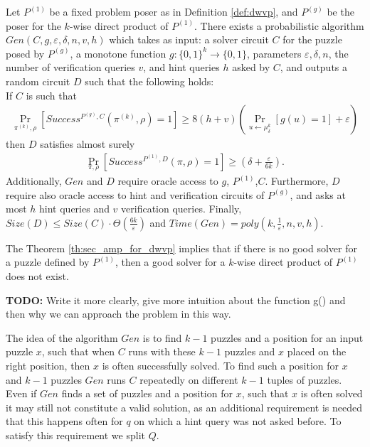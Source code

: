 \begin{theorem}
\label{th:sec_amp_for_dwvp}
Let $P^{(1)}$ be a fixed problem poser as in Definition \ref{def:dwvp}, and $P^{(g)}$ be the poser for the $k$-wise direct product of $P^{(1)}$.
There exists a probabilistic algorithm $Gen(C, g, \varepsilon, \delta, n, v, h)$ which takes as input: a solver circuit $C$ for the puzzle posed by $P^{(g)}$,
a monotone function $g:\{0,1\}^k \rightarrow \{0,1\}$, parameters $\varepsilon, \delta,n$,
the number of verification queries $v$, and hint queries $h$ asked by $C$, and outputs a random circuit $D$
such that the following holds: \\
If $C$ is such that \\
  \begin{align*}
    \underset{\pi^{(k)}, \rho}{\Pr}[Success^{P^{(g)}, C}(\pi^{(k)}, \rho) = 1] \geq 8(h+v)\left(\underset{u \leftarrow \mu_\delta^k}{\Pr}[g(u) = 1] + \varepsilon\right)
  \end{align*}
then $D$ satisfies almost surely
  \begin{align*}
    \underset{\pi, \rho}{\Pr}[Success^{P^{(1)},D}(\pi, \rho) = 1] \geq (\delta + \frac{\varepsilon}{6k}).
  \end{align*}
Additionally, $Gen$ and $D$ require oracle access to $g$, $P^{(1)}$,$C$.
Furthermore, $D$ require also oracle access to hint and verification circuits of $P^{(g)}$,
and asks at most $h$ hint queries and $v$ verification queries.
Finally, $Size(D) \leq Size(C) \cdot \Theta(\frac{6k}{\varepsilon})$ and $Time(Gen) = poly(k, \frac{1}{\varepsilon}, n, v, h)$.
\end{theorem}
%
The Theorem \ref{th:sec_amp_for_dwvp} implies that if there is no good solver for a puzzle defined by $P^{(1)}$, then a good solver for
a $k$-wise direct product of $P^{(1)}$ does not exist.

\begin{todo}
  \textbf{TODO:} Write it more clearly, give more intuition about the function g() and then why we can approach the problem in this way.
\end{todo}

The idea of the algorithm $Gen$ is to find $k-1$ puzzles and a position for an input puzzle $x$, such that
when $C$ runs with these $k-1$ puzzles and $x$ placed on the right position, then $x$ is often successfully solved.
To find such a position for $x$ and $k-1$ puzzles $Gen$ runs $C$ repeatedly on different $k-1$ tuples of puzzles.
Even if $Gen$ finds a set of puzzles and a position for $x$, such that $x$ is often solved it may still not
constitute a valid solution, as an additional requirement is needed that this happens often for $q$
on which a hint query was not asked before. To satisfy this requirement we split $Q$.
